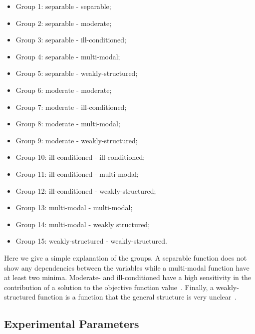 \begin{itemize}
	\item Group 1: separable - separable;%
    \item Group 2: separable - moderate;%
	\item Group 3: separable - ill-conditioned;%
	\item Group 4: separable - multi-modal;%
	\item Group 5: separable - weakly-structured;%
	\item Group 6: moderate - moderate;%
	\item Group 7: moderate - ill-conditioned;%
	\item Group 8: moderate - multi-modal;%
	\item Group 9: moderate - weakly-structured;%
	\item Group 10: ill-conditioned - ill-conditioned;%
	\item Group 11: ill-conditioned - multi-modal;%
	\item Group 12: ill-conditioned - weakly-structured;%
	\item Group 13: multi-modal - multi-modal;%
	\item Group 14: multi-modal - weakly structured;%
	\item Group 15: weakly-structured - weakly-structured.%
\end{itemize}

Here we give a simple explanation of the groups. A separable function does not show any dependencies between the variables while a multi-modal function have at least two minima. Moderate- and ill-conditioned have a high sensitivity in the contribution of a solution to the objective function value~\cite{hansen2011impacts}. Finally, a weakly-structured function is a function that the general structure is very unclear~\cite{finck2010real}.


\subsection{Experimental Parameters}

